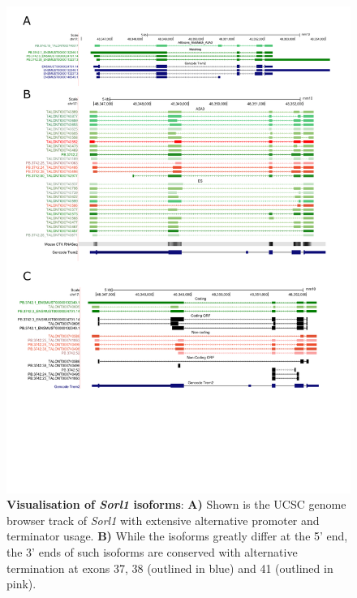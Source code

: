 \begin{figure}[htp]
	\begin{center}
		\includegraphics[page=12,trim={0 6cm 0 0},scale = 0.85]{Figures/pdfjoiner.pdf}
	\end{center}
	\captionsetup{width=0.95\textwidth}
	\caption[Visualisation of \textit{Sorl1} isoforms]%
	{\textbf{Visualisation of \textit{Sorl1} isoforms}: \textbf{A)} Shown is the UCSC genome browser track of \textit{Sorl1} with extensive alternative promoter and terminator usage. \textbf{B)} While the isoforms greatly differ at the 5' end, the 3' ends of such isoforms are conserved with alternative termination at exons 37, 38 (outlined in blue) and 41 (outlined in pink).}   
	\label{fig:sorl1_track2}
\end{figure}

\newpage

